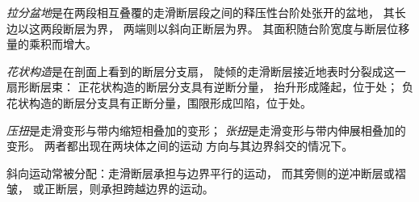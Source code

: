 \begin{definition}[拉分盆地]\label{def:b3:extension-strike-slip:pull-apart}
\emph{拉分盆地}是在两段相互叠覆的走滑断层段之间的释压性台阶处张开的盆地，
其长边以这两段断层为界，
两端则以斜向正断层为界。
其面积随台阶宽度与断层位移量的乘积而增大。
\end{definition}

\begin{definition}[花状构造]\label{def:b3:extension-strike-slip:flower}
\emph{花状构造}是在剖面上看到的断层分支扇，
陡倾的走滑断层接近地表时分裂成这一扇形断层束：
正花状构造的断层分支具有逆断分量，
抬升形成隆起，位于处；
负花状构造的断层分支具有正断分量，围限形成凹陷，位于处。
\end{definition}

\begin{definition}[压扭，张扭]\label{def:b3:extension-strike-slip:transpression}
\emph{压扭}是走滑变形与带内缩短相叠加的变形；
\emph{张扭}是走滑变形与带内伸展相叠加的变形。
两者都出现在两块体之间的运动
方向与其边界斜交的情况下。
\end{definition}

斜向运动常被分配：走滑断层承担与边界平行的运动，
而其旁侧的逆冲断层或褶皱，
或正断层，则承担跨越边界的运动。

